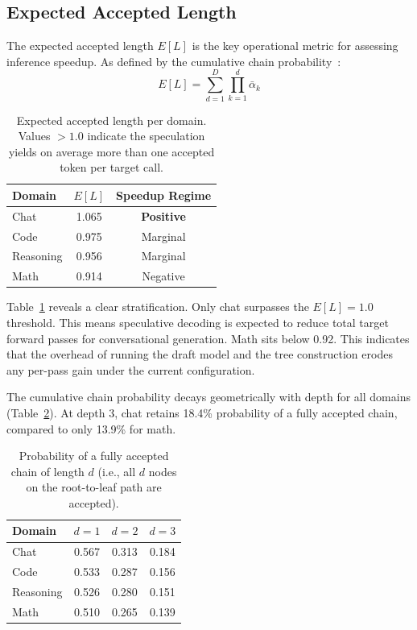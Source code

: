 \documentclass[conference]{IEEEtran}
\begin{document}
\subsection{Expected Accepted Length}

The expected accepted length $E[L]$ is the key operational metric for
assessing inference speedup. As defined by the cumulative chain
probability~\cite{miao2024specinfer}:
\begin{equation}
  E[L] = \sum_{d=1}^{D} \prod_{k=1}^{d} \bar{\alpha}_k
\end{equation}

\begin{table}[h]
\centering
\caption{Expected accepted length per domain. Values $> 1.0$ indicate the
speculation yields on average more than one accepted token per target call.}
\label{tab:el}
\begin{tabular}{lcc}
\toprule
Domain & $E[L]$ & Speedup Regime \\
\midrule
Chat      & 1.065 & \textbf{Positive} \\
Code      & 0.975 & Marginal \\
Reasoning & 0.956 & Marginal \\
Math      & 0.914 & Negative \\
\bottomrule
\end{tabular}
\end{table}

Table~\ref{tab:el} reveals a clear stratification. Only chat surpasses the
$E[L]=1.0$ threshold. This means speculative decoding is expected to reduce
total target forward passes for conversational generation. Math sits below
0.92. This indicates that the overhead of running the draft model and the tree
construction erodes any per-pass gain under the current configuration.

The cumulative chain probability decays geometrically with depth for all
domains (Table~\ref{tab:cum}). At depth 3, chat retains 18.4\% probability
of a fully accepted chain, compared to only 13.9\% for math.

\begin{table}[h]
\centering
\caption{Probability of a fully accepted chain of length $d$ (i.e., all $d$
nodes on the root-to-leaf path are accepted).}
\label{tab:cum}
\begin{tabular}{lccc}
\toprule
Domain & $d=1$ & $d=2$ & $d=3$ \\
\midrule
Chat      & 0.567 & 0.313 & 0.184 \\
Code      & 0.533 & 0.287 & 0.156 \\
Reasoning & 0.526 & 0.280 & 0.151 \\
Math      & 0.510 & 0.265 & 0.139 \\
\bottomrule
\end{tabular}
\end{table}
\end{document}
